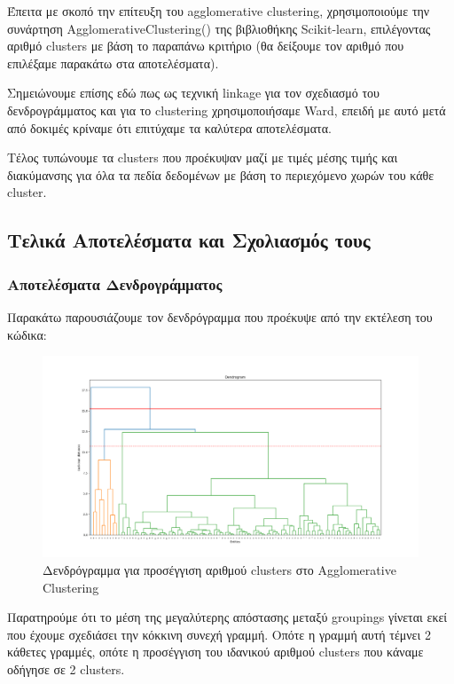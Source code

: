 \documentclass[12pt,a4paper]{article}
\begin{document}
Έπειτα με σκοπό την επίτευξη του agglomerative clustering, χρησιμοποιούμε την συνάρτηση AgglomerativeClustering() της βιβλιοθήκης Scikit-learn, επιλέγοντας αριθμό clusters με βάση το παραπάνω κριτήριο (θα δείξουμε τον αριθμό που επιλέξαμε παρακάτω στα αποτελέσματα).

Σημειώνουμε επίσης εδώ πως ως τεχνική linkage για τον σχεδιασμό του δενδρογράμματος και για το clustering χρησιμοποιήσαμε Ward, επειδή με αυτό μετά από δοκιμές κρίναμε ότι επιτύχαμε τα καλύτερα αποτελέσματα.

Τέλος τυπώνουμε τα clusters που προέκυψαν μαζί με τιμές μέσης τιμής και διακύμανσης για όλα τα πεδία δεδομένων με βάση το περιεχόμενο χωρών του κάθε cluster.

\subsection{Τελικά Αποτελέσματα και Σχολιασμός τους}

\subsubsection{Αποτελέσματα Δενδρογράμματος}

Παρακάτω παρουσιάζουμε τον δενδρόγραμμα που προέκυψε από την εκτέλεση του κώδικα:

\begin{figure}[H]
	\includegraphics[width=\textwidth]{Figures/Question2/1. Dendrogram.png}
	\caption{Δενδρόγραμμα για προσέγγιση αριθμού clusters στο Agglomerative Clustering}
\end{figure}

Παρατηρούμε ότι το μέση της μεγαλύτερης απόστασης μεταξύ groupings γίνεται εκεί που έχουμε σχεδιάσει την κόκκινη συνεχή γραμμή. Οπότε η γραμμή αυτή τέμνει 2 κάθετες γραμμές, οπότε η προσέγγιση του ιδανικού αριθμού clusters που κάναμε οδήγησε σε 2 clusters.
\end{document}
